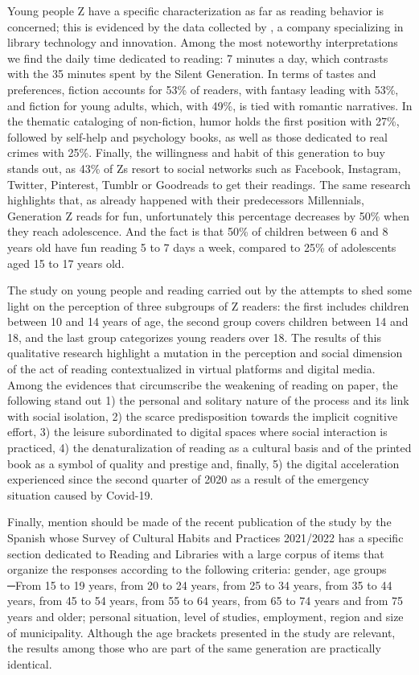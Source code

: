 \documentclass[english]{textolivre}
\begin{document}
Young people Z have a specific characterization as far as reading behavior is concerned; this is evidenced by the data collected by \textcite{comunidadbaratz}, a company specializing in library technology and innovation. Among the most noteworthy interpretations we find the daily time dedicated to reading: 7 minutes a day, which contrasts with the 35 minutes spent by the Silent Generation. In terms of tastes and preferences, fiction accounts for 53\% of readers, with fantasy leading with 53\%, and fiction for young adults, which, with 49\%, is tied with romantic narratives. In the thematic cataloging of non-fiction, humor holds the first position with 27\%, followed by self-help and psychology books, as well as those dedicated to real crimes with 25\%. Finally, the willingness and habit of this generation to buy stands out, as 43\% of Zs resort to social networks such as Facebook, Instagram, Twitter, Pinterest, Tumblr or Goodreads to get their readings. The same research highlights that, as already happened with their predecessors Millennials, Generation Z reads for fun, unfortunately this percentage decreases by 50\% when they reach adolescence. And the fact is that 50\% of children between 6 and 8 years old have fun reading 5 to 7 days a week, compared to 25\% of adolescents aged 15 to 17 years old. 

The study on young people and reading carried out by the \textcite{fundacionn2022} attempts to shed some light on the perception of three subgroups of Z readers: the first includes children between 10 and 14 years of age, the second group covers children between 14 and 18, and the last group categorizes young readers over 18. The results of this qualitative research highlight a mutation in the perception and social dimension of the act of reading contextualized in virtual platforms and digital media. Among the evidences that circumscribe the weakening of reading on paper, the following stand out 1) the personal and solitary nature of the process and its link with social isolation, 2) the scarce predisposition towards the implicit cognitive effort, 3) the leisure subordinated to digital spaces where social interaction is practiced, 4) the denaturalization of reading as a cultural basis and of the printed book as a symbol of quality and prestige and, finally, 5) the digital acceleration experienced since the second quarter of 2020 as a result of the emergency situation caused by Covid-19.

Finally, mention should be made of the recent publication of the study by the Spanish \textcite{ministeriodeporte2022} whose Survey of Cultural Habits and Practices 2021/2022 has a specific section dedicated to Reading and Libraries with a large corpus of items that organize the responses according to the following criteria: gender, age groups ─From 15 to 19 years, from 20 to 24 years, from 25 to 34 years, from 35 to 44 years, from 45 to 54 years, from 55 to 64 years, from 65 to 74 years and from 75 years and older; personal situation, level of studies, employment, region and size of municipality. Although the age brackets presented in the study are relevant, the results among those who are part of the same generation are practically identical.
\end{document}
